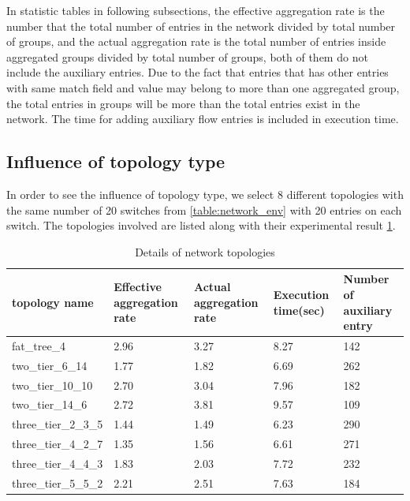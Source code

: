 In statistic tables in following subsections, the effective aggregation rate is the number that the total number of entries in the network divided by total number of groups, and the actual aggregation rate is the total number of entries inside aggregated groups divided by total number of groups, both of them do not include the auxiliary entries. Due to the fact that entries that has other entries with same match field and value may belong to more than one aggregated group, the total entries in groups will be more than the total entries exist in the network. The time for adding auxiliary flow entries is included in execution time.

\subsection{Influence of topology type}
In order to see the influence of topology type, we select 8 different topologies with the same number of 20 switches from \ref{table:network_env} with 20 entries on each switch. The topologies involved are listed along with their experimental result \ref{table:different_topo_type}. 


\begin{table}
\centering
\caption{Details of network topologies}
\begin{tabular}{|l||l|l|l|l|}
\hline topology name & Effective aggregation rate & Actual aggregation rate & Execution time(sec) & Number of auxiliary entry \\
\hline
\hline fat\_tree\_4 & 2.96 & 3.27 & 8.27 & 142 \\
\hline two\_tier\_6\_14 & 1.77 & 1.82 & 6.69 & 262 \\ 
\hline two\_tier\_10\_10 & 2.70 & 3.04 & 7.96 & 182 \\
\hline two\_tier\_14\_6 & 2.72 & 3.81 & 9.57 & 109 \\ 
\hline three\_tier\_2\_3\_5 & 1.44 & 1.49 & 6.23 & 290 \\
\hline three\_tier\_4\_2\_7 & 1.35 & 1.56 & 6.61 & 271 \\
\hline three\_tier\_4\_4\_3 & 1.83 & 2.03 & 7.72 & 232 \\
\hline three\_tier\_5\_5\_2 & 2.21 & 2.51 & 7.63 & 184 \\
\end{tabular}
\label{table:different_topo_type}
\end{table}

